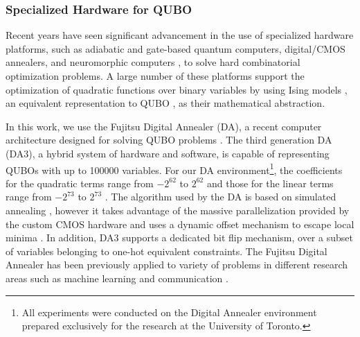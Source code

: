 \documentclass[preprint,12pt]{elsarticle}
\newcommand{\todo}[1]{{\textcolor{red}{\bf {#1}}}}
\begin{document}





\subsubsection{Specialized Hardware for QUBO}

Recent years have seen significant advancement in the use of specialized hardware platforms, such as adiabatic and gate-based quantum computers, digital/CMOS annealers, and neuromorphic computers \cite{coffrin2019evaluating}, to solve hard combinatorial optimization problems. A large number of these platforms support the optimization of quadratic functions over binary variables by using Ising models \cite{johnson2011quantum}, an equivalent representation to QUBO \cite{bian2010ising}, as their mathematical abstraction.

In this work, we use the Fujitsu Digital Annealer (DA), a recent computer architecture designed for solving QUBO problems \cite{matsubara2020digital}. The third generation DA (DA3), a hybrid system of hardware and software, is capable of representing QUBOs with up to 100000 variables. For our DA environment\footnote{All experiments were conducted on the Digital Annealer environment prepared exclusively for the research at the University of Toronto.}, the coefficients for the quadratic terms range from $-2^{62}$ to $2^{62}$ and those for the linear terms range from $-2^{73}$ to $2^{73}$ \cite{DA3}. The algorithm used by the DA is based on simulated annealing \cite{kirkpatrick1983optimization}, however it takes advantage of the massive parallelization provided by the custom CMOS hardware and uses a dynamic offset mechanism to escape local minima \cite{aramon2019physics}. In addition, DA3 supports a dedicated bit flip mechanism, over a subset of variables belonging to one-hot equivalent constraints. The Fujitsu Digital Annealer has been previously applied to variety of problems in different research areas such as machine learning \cite{cohen2020ising,salehinejad2019ising} and communication \cite{naghsh2019digitally,rahman2019ising}.
\end{document}
